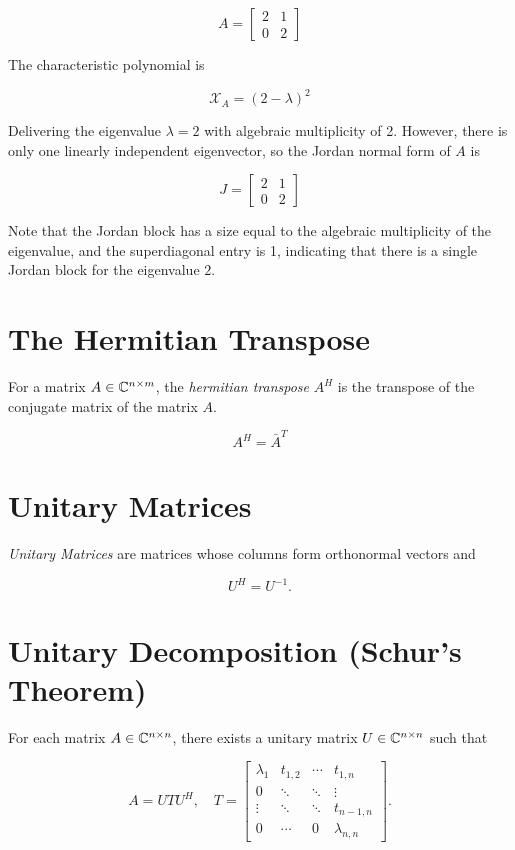 \[
    A = \begin{bmatrix}
        2 & 1 \\
        0 & 2
    \end{bmatrix}
\]

The characteristic polynomial is

\[
    \mathcal{X}_A = (2 - \lambda)^2
\]

Delivering the eigenvalue \(\lambda = 2\) with algebraic multiplicity of 2. However, there is only one linearly independent eigenvector, so the Jordan normal form of \(A\) is

\[
    J = \begin{bmatrix}
        2 & 1 \\
        0 & 2
    \end{bmatrix}
\]

Note that the Jordan block has a size equal to the algebraic multiplicity of the eigenvalue, and the superdiagonal entry is 1, indicating that there is a single Jordan block for the eigenvalue \(2\).

\section{The Hermitian Transpose}

For a matrix \(A \in \mathbb{C}^{n \times m}\), the \emph{hermitian transpose} \(A^H\) is the transpose of the conjugate matrix of the 
matrix \(A\).

\[
    A^H = \bar{A}^T
\]

\section{Unitary Matrices}

\emph{Unitary Matrices} are matrices whose columns form orthonormal vectors and

\[
    U^H = U^{-1}.
\]

\section{Unitary Decomposition (Schur's Theorem)}

For each matrix \(A \in \mathbb{C}^{n \times n}\), there exists a unitary matrix \(U \in \mathbb{C}^{n \times n}\) such that 

\[
    A = U T U^H, \quad
    T = 
    \begin{bmatrix}
        \lambda_1 & t_{1,2} & \cdots & t_{1,n} \\ 
        0 & \ddots & \ddots &  \vdots \\ 
        \vdots & \ddots & \ddots &  t_{n-1, n} \\ 
        0 & \cdots & 0 & \lambda_{n,n}
    \end{bmatrix}.
\]

